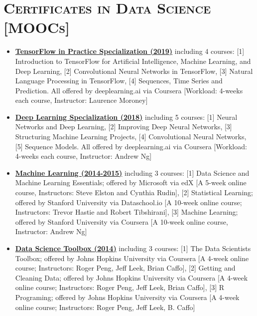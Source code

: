 \documentclass[10pt,a4paper]{moderncv}
\begin{document}
\section{\textsc{Certificates in Data Science [MOOCs]}}

\begin{itemize}
\item \textbf{\href{https://www.coursera.org/specializations/tensorflow-in-practice}{TensorFlow in Practice Specialization (2019)} }including 4 courses: [1] Introduction to TensorFlow for Artificial Intelligence, Machine Learning, and Deep Learning, [2] Convolutional Neural Networks in TensorFlow, [3] Natural Language Processing in TensorFlow, [4] Sequences, Time Series and Prediction. All offered by deeplearning.ai via Coursera [Workload: 4-weeks each course, Instructor: Laurence Moroney]
\vspace{.2cm}

\item \textbf{\href{https://www.coursera.org/specializations/deep-learning}{Deep Learning Specialization (2018)}} including 5 courses: [1] Neural Networks and Deep Learning, [2] Improving Deep Neural Networks, [3] Structuring Machine Learning Projects, [4] Convolutional Neural Networks, [5] Sequence Models. All offered by deeplearning.ai via Coursera [Workload: 4-weeks each course, Instructor: Andrew Ng]
\vspace{.2cm}

\item \textbf{\href{}{Machine Learning (2014-2015)}} including 3 courses: [1] Data Science and Machine Learning Essentials; offered by Microsoft via edX [A 5-week online course, Instructors: Steve Elston and Cynthia Rudin], [2] Statistical Learning; offered by Stanford University via Dataschool.io [A 10-week online course; Instructors: Trevor Hastie and Robert Tibshirani], [3] Machine Learning; offered by Stanford University via Coursera [A 10-week online course, Instructor: Andrew Ng]
\vspace{.2cm}

\item \textbf{\href{}{Data Science Toolbox (2014)}} including 3 courses: [1] The Data Scientists Toolbox; offered by Johns Hopkins University via Coursera [A 4-week online course; Instructors: Roger Peng, Jeff Leek, Brian Caffo], [2] Getting and Cleaning Data; offered by Johns Hopkins University via Coursera [A 4-week online course; Instructors: Roger Peng, Jeff Leek, Brian Caffo], [3] R Programing; offered by Johns Hopkins University via Coursera [A 4-week online course; Instructors: Roger Peng, Jeff Leek, B. Caffo]

\end{itemize} 
\end{document}
